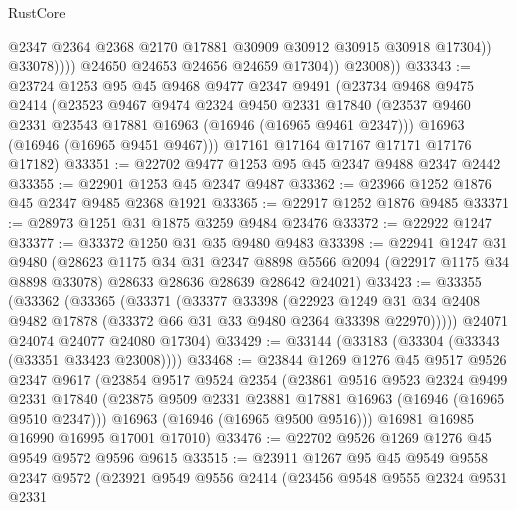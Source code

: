 \begin{lexlean}{RustCore}
\begin{coremodule}
                        @2347
                        @2364
                        @2368
                        @2170
                        @17881
                        @30909
                        @30912
                        @30915
                        @30918
                        @17304))
                    @33078))))
            @24650
            @24653
            @24656
            @24659
            @17304))
        @23008))
@33343 := @23724
    @1253
    @95
    @45
    @9468
    @9477
    @2347
    @9491
    (@23734
      @9468
      @9475
      @2414
      (@23523
        @9467
        @9474
        @2324
        @9450
        @2331
        @17840
        (@23537 @9460 @2331 @23543 @17881 @16963 (@16946 (@16965 @9461 @2347)))
        @16963
        (@16946 (@16965 @9451 @9467)))
      @17161
      @17164
      @17167
      @17171
      @17176
      @17182)
@33351 := @22702 @9477 @1253 @95 @45 @2347 @9488 @2347 @2442
@33355 := @22901 @1253 @45 @2347 @9487
@33362 := @23966 @1252 @1876 @45 @2347 @9485 @2368 @1921
@33365 := @22917 @1252 @1876 @9485
@33371 := @28973 @1251 @31 @1875 @3259 @9484 @23476
@33372 := @22922 @1247
@33377 := @33372 @1250 @31 @35 @9480 @9483
@33398 := @22941
    @1247
    @31
    @9480
    (@28623
      @1175
      @34
      @31
      @2347
      @8898
      @5566
      @2094
      (@22917 @1175 @34 @8898 @33078)
      @28633
      @28636
      @28639
      @28642
      @24021)
@33423 := @33355
    (@33362
      (@33365
        (@33371
          (@33377
            @33398
            (@22923
              @1249
              @31
              @34
              @2408
              @9482
              @17878
              (@33372 @66 @31 @33 @9480 @2364 @33398 @22970)))))
      @24071
      @24074
      @24077
      @24080
      @17304)
@33429 := @33144 (@33183 (@33304 (@33343 (@33351 @33423 @23008))))
@33468 := @23844
    @1269
    @1276
    @45
    @9517
    @9526
    @2347
    @9617
    (@23854
      @9517
      @9524
      @2354
      (@23861
        @9516
        @9523
        @2324
        @9499
        @2331
        @17840
        (@23875 @9509 @2331 @23881 @17881 @16963 (@16946 (@16965 @9510 @2347)))
        @16963
        (@16946 (@16965 @9500 @9516)))
      @16981
      @16985
      @16990
      @16995
      @17001
      @17010)
@33476 := @22702 @9526 @1269 @1276 @45 @9549 @9572 @9596 @9615
@33515 := @23911
    @1267
    @95
    @45
    @9549
    @9558
    @2347
    @9572
    (@23921
      @9549
      @9556
      @2414
      (@23456
        @9548
        @9555
        @2324
        @9531
        @2331

\end{coremodule}
\end{lexlean}
